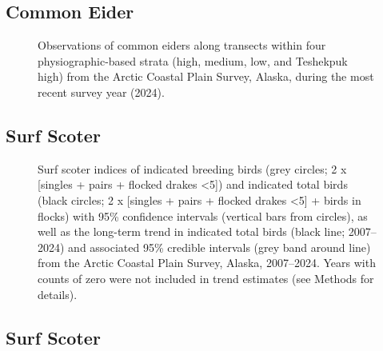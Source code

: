 \documentclass[
]{article}
\begin{document}
\newpage{}

\subsection*{Common Eider}\label{common-eider-2}

\begin{figure}


\caption{\label{fig-COEImap}Observations of common eiders along
transects within four physiographic-based strata (high, medium, low, and
Teshekpuk high) from the Arctic Coastal Plain Survey, Alaska, during the
most recent survey year (2024).}

\end{figure}%

\newpage{}

\subsection*{Surf Scoter}\label{surf-scoter}

\begin{figure}


\caption{\label{fig-SUSC}Surf scoter indices of indicated breeding birds
(grey circles; 2 x {[}singles + pairs + flocked drakes \textless5{]})
and indicated total birds (black circles; 2 x {[}singles + pairs +
flocked drakes \textless5{]} + birds in flocks) with 95\% confidence
intervals (vertical bars from circles), as well as the long-term trend
in indicated total birds (black line; 2007--2024) and associated 95\%
credible intervals (grey band around line) from the Arctic Coastal Plain
Survey, Alaska, 2007--2024. Years with counts of zero were not included
in trend estimates (see Methods for details).}

\end{figure}%

\newpage{}

\subsection*{Surf Scoter}\label{surf-scoter-1}
\end{document}
